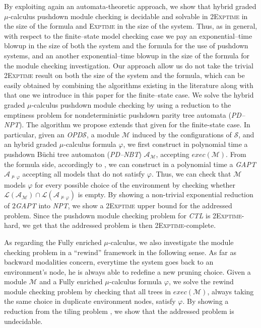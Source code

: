 \documentclass{LMCS}
\theoremstyle{plain}
\def \A             {\mathcal{A}}
\def \CTL           {\emph{CTL}\xspace}
\def \EXPTIME       {\textsc{Exptime}\xspace}
\def \GAPT          {\emph{GAPT}\xspace}
\def \L             {\mathcal{L}}
\def \M             {\mathcal{M}}
\def \NPT           {\emph{NPT}\xspace}
\def \OPD           {\emph{OPD}\xspace}
\def \PDNBT         {\emph{PD--NBT}\xspace}
\def \PDNPT         {\emph{PD--NPT}\xspace}
\def \S             {\mathcal{S}}
\def \TGAPT         {\emph{$2$GAPT}\xspace}
\def \TWOEXPTIME    {\textsc{2Exptime}\xspace}
\begin{document}
By exploiting again an automata-theoretic approach, we show that hybrid graded
$\mu$-calculus pushdown module checking is decidable and solvable in
\TWOEXPTIME in the size of the formula and \EXPTIME in the size of the system.
Thus, as in general, with respect to the finite--state model checking case we
pay an exponential--time blowup in the size of both the system and the formula
for the use of pushdown systems, and an another exponential--time blowup in the
size of the formula for the module checking investigation. Our approach allow
us do not take the trivial \TWOEXPTIME result on both the size of the system
and the formula, which can be easily obtained by combining the algorithms
existing in the literature along with that one we introduce in this paper for
the finite--state case. We solve the hybrid graded $\mu$-calculus pushdown
module checking by using a reduction to the emptiness problem for
nondeterministic pushdown parity tree automata (\PDNPT). The algorithm we
propose extends that given for the finite-state case. In particular, given an
\OPD $\S$, a module $\M$ induced by the configurations of $\S$, and an hybrid
graded $\mu$-calculus formula $\varphi$, we first construct in polynomial time
a pushdown B\"uchi tree automaton (\PDNBT) $\A_{\M}$, accepting $exec(\M)$.
From the formula side, accordingly to \cite{BLMV06}, we can construct in a
polynomial time a \GAPT $\A_{\not \models \varphi}$ accepting all models that
do not satisfy $\varphi$. Thus, we can check that $\M$ models $\varphi$ for
every possible choice of the environment by checking whether $\L(\A_{\M}) \cap
\L(\A_{\not \models \varphi})$ is empty. By showing a non-trivial exponential
reduction of \TGAPT into \NPT, we show a \TWOEXPTIME upper bound for the
addressed problem. Since the pushdown module checking problem for \CTL is
\TWOEXPTIME-hard, we get that the addressed problem is then
\TWOEXPTIME-complete.


As regarding the Fully enriched $\mu$-calculus, we also investigate the module
checking problem in a ``rewind'' framework in the following sense. As far as
backward modalities concern, everytime the system goes back to an environment's
node, he is always able to redefine a new pruning choice. Given a module $\M$
and a Fully enriched $\mu$-calculus formula $\varphi$, we solve the rewind
module checking problem by checking that all trees in $exec(\M)$, always taking
the same choice in duplicate environment nodes, satisfy $\varphi$. By showing a
reduction from the tiling problem \cite{Ber66}, we show that the addressed
problem is undecidable.
\end{document}
